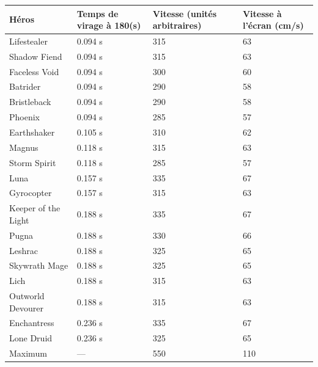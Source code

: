 	
	\newcommand{\newrow}{\bigstrut[t] \\ \hline}
	\begin{table}[H]
		\centering
		\begin{tabularx}{\textwidth}{ Y X X X } %
		Héros				&	Temps de virage à 180\textdegree(s)	&	Vitesse (unités arbitraires)	&	Vitesse à l'écran (cm/s)	\newrow
		Lifestealer			&	0.094 s								&	315								&	63							\newrow
		Shadow Fiend		&	0.094 s								&	315								&	63							\newrow
		Faceless Void		&	0.094 s								&	300								&	60							\newrow
		Batrider			&	0.094 s								&	290								&	58							\newrow
		Bristleback			&	0.094 s								&	290								&	58							\newrow
		Phoenix				&	0.094 s								&	285								&	57							\newrow
		Earthshaker			&	0.105 s								&	310								&	62							\newrow
		Magnus				&	0.118 s								&	315								&	63							\newrow
		Storm Spirit		&	0.118 s								&	285								&	57							\newrow
		Luna				&	0.157 s								&	335								&	67							\newrow
		Gyrocopter			&	0.157 s								&	315								&	63							\newrow
		Keeper of the Light	&	0.188 s								&	335								&	67							\newrow
		Pugna				&	0.188 s								&	330								&	66							\newrow
		Leshrac				&	0.188 s								&	325								&	65							\newrow
		Skywrath Mage		&	0.188 s								&	325								&	65							\newrow
		Lich				&	0.188 s								&	315								&	63							\newrow
		Outworld Devourer	&	0.188 s								&	315								&	63							\newrow
		Enchantress			&	0.236 s								&	335								&	67							\newrow
		Lone Druid			&	0.236 s								&	325								&	65							\newrow
		\og Maximum \fg{}	&	---									&	550								&	110							\bigstrut[t] \\
		\end{tabularx}

\end{table}
